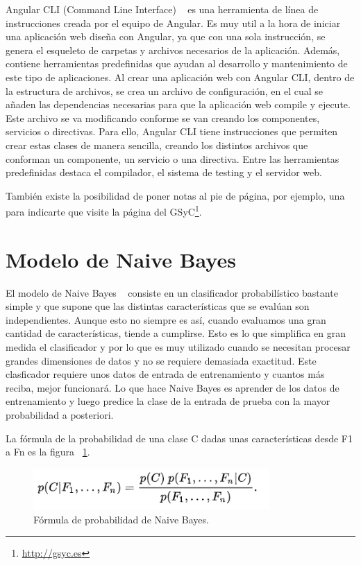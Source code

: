\documentclass[a4paper, 12pt]{book}
\begin{document}
Angular CLI (Command Line Interface) ~\cite{articulobayes} es una herramienta de línea de instrucciones creada por el equipo de Angular. Es muy util a la hora de iniciar una aplicación web diseña con Angular, ya que con una sola instrucción, se genera el esqueleto de carpetas y archivos necesarios de la aplicación. Además, contiene herramientas predefinidas que ayudan al desarrollo y mantenimiento de este tipo de aplicaciones. Al crear una aplicación web con Angular CLI, dentro de la estructura de archivos, se crea un archivo de configuración, en el cual se añaden las dependencias necesarias para que la aplicación web compile y ejecute. Este archivo se va modificando conforme se van creando los componentes, servicios o directivas. Para ello, Angular CLI tiene instrucciones que permiten crear estas clases de manera sencilla, creando los distintos archivos que conforman un componente, un servicio o una directiva. Entre las herramientas predefinidas destaca el compilador, el sistema de testing y el servidor web.


También existe la posibilidad de poner notas al pie de página, por ejemplo, una para indicarte que visite la página del GSyC\footnote{\url{http://gsyc.es}}.

\section{Modelo de Naive Bayes} 
\label{sec:modelobayes}

El modelo de Naive Bayes ~\cite{articulobayes} consiste en un clasificador probabilístico bastante simple y que supone que las distintas características que se evalúan son independientes. Aunque esto no siempre es así, cuando evaluamos una gran cantidad de características, tiende a cumplirse. Esto es lo que simplifica en gran medida el clasificador y por lo que es muy utilizado cuando se necesitan procesar grandes dimensiones de datos y no se requiere demasiada exactitud. Este clasficador requiere unos datos de entrada de entrenamiento y cuantos más reciba, mejor funcionará. Lo que hace Naive Bayes es aprender de los datos de entrenamiento y luego predice la clase de la entrada de prueba con la mayor probabilidad a posteriori.

La fórmula de la probabilidad de una clase C dadas unas características desde F1 a Fn es la figura ~\ref{fig:formulabayes}.

\begin{figure}
	\centering
	\includegraphics[width=9cm, keepaspectratio]{img/formulabayes}
	\caption{Fórmula de probabilidad de Naive Bayes.}
	\label{fig:formulabayes}
\end{figure}
\end{document}
